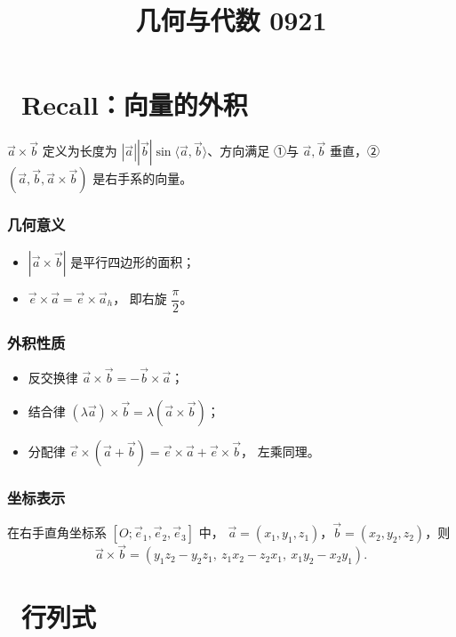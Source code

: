\documentclass[UTF8,11pt]{ctexart}
\title{几何与代数 0921}
\date{}
\theoremstyle{cnthm}
\begin{document}
\maketitle

\section{\ Recall：向量的外积}

$\vec a\times\vec b$ 定义为长度为
$|\vec a||\vec b|\sin\langle\vec a,\vec b\rangle$、方向满足
①与 $\vec a,\vec b$ 垂直，②$(\vec a,\vec b,\vec a\times\vec b)$
是右手系的向量。

\subsubsection*{几何意义}

\begin{itemize}
\item $|\vec a\times\vec b|$ 是平行四边形的面积；
\item $\vec e\times\vec a=\vec e\times\vec a_h$，
即右旋 $\dfrac\pi2$。
\end{itemize}

\subsubsection*{外积性质}

\begin{itemize}
\item 反交换律\quad
$\vec a\times\vec b=-\vec b\times\vec a$；
\item 结合律\quad
$(\lambda\vec a)\times\vec b=\lambda(\vec a\times\vec b)$；
\item 分配律\quad
$\vec e\times(\vec a+\vec b)
=\vec e\times\vec a+\vec e\times\vec b$，
左乘同理。
\end{itemize}

\subsubsection*{坐标表示}

在右手直角坐标系
$[O;\vec e_1,\vec e_2,\vec e_3]$ 中，
$\vec a=(x_1,y_1,z_1)$，$\vec b=(x_2,y_2,z_2)$，则
\[
\vec a\times\vec b
=(y_1z_2-y_2z_1,\ z_1x_2-z_2x_1,\ x_1y_2-x_2y_1).
\]

\section{\ 行列式}
\end{document}
